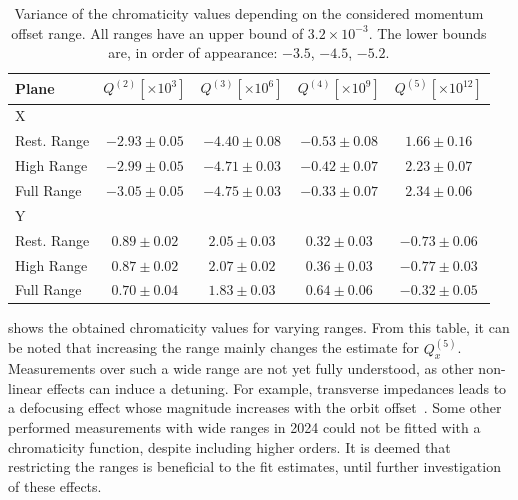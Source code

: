 \begin{table}[!htb]
    \centering
    \begin{tabular}{lcccc}
      \toprule
      Plane & $Q^{(2)} [\times 10^{3}]$ & $Q^{(3)} [\times 10^{6}]$ & $Q^{(4)} [\times 10^{9}]$ & $Q^{(5)} [\times 10^{12}]$ \\
      \midrule
      X &&&& \\  
      \hspace{2mm}Rest. Range &$-2.93 \pm 0.05$ & $-4.40 \pm 0.08$ & $-0.53 \pm 0.08$ & $ 1.66 \pm 0.16$ \\
      \hspace{2mm}High Range  &$-2.99 \pm 0.05$ & $-4.71 \pm 0.03$ & $-0.42 \pm 0.07$ & $ 2.23 \pm 0.07$ \\
      \hspace{2mm}Full Range  &$-3.05 \pm 0.05$ & $-4.75 \pm 0.03$ & $-0.33 \pm 0.07$ & $ 2.34 \pm 0.06$ \\
      Y &&&& \\  
      \hspace{2mm}Rest. Range &$ 0.89 \pm 0.02$ & $ 2.05 \pm 0.03$ & $ 0.32 \pm 0.03$ & $-0.73 \pm 0.06$ \\
      \hspace{2mm}High Range  &$ 0.87 \pm 0.02$ & $ 2.07 \pm 0.02$ & $ 0.36 \pm 0.03$ & $-0.77 \pm 0.03$ \\
      \hspace{2mm}Full Range  &$ 0.70 \pm 0.04$ & $ 1.83 \pm 0.03$ & $ 0.64 \pm 0.06$ & $-0.32 \pm 0.05$ \\
      \bottomrule
    \end{tabular}
    \caption{Variance of the chromaticity values depending on the considered momentum offset range.
    All ranges have an upper bound of $3.2\times10^{-3}$. The lower bounds are, in order of
    appearance: $-3.5$, $-4.5$, $-5.2$.}
    \label{tab:high_orders:further:chroma_different_ranges}
  \end{table}

 shows the obtained chromaticity values for
varying ranges. From this table, it can be noted that increasing the range mainly
changes the estimate for $Q^{(5)}_x$.
Measurements over such a wide range are not yet fully understood, as other non-linear effects can
induce a detuning. For example, transverse impedances leads to a defocusing effect whose magnitude
increases with the orbit offset~\cite{antipov_single-collimator_2018,kurtulus_lhc_2022}.
Some other performed measurements with wide ranges in 2024 could not be fitted with a chromaticity
function, despite including higher orders. It is deemed that restricting the ranges is beneficial to
the fit estimates, until further investigation of these effects.



